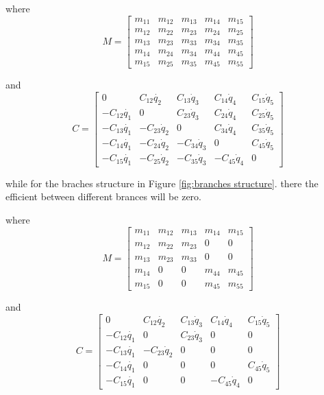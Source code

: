 where
\[
M=\left[\begin{array}{ccccc}
m_{11} & m_{12} & m_{13} & m_{14} & m_{15}\\
m_{12} & m_{22} & m_{23} & m_{24} & m_{25}\\
m_{13} & m_{23} & m_{33} & m_{34} & m_{35}\\
m_{14} & m_{24} & m_{34} & m_{44} & m_{45}\\
m_{15} & m_{25} & m_{35} & m_{45} & m_{55}\end{array}\right]
\]

and
\[
C=\left[\begin{array}{ccccc}
0 & C_{12}\dot{q_{2}} & C_{13}\dot{q}_{3} & C_{14}\dot{q}_{4} & C_{15}\dot{q}_{5}\\
-C_{12}\dot{q_{1}} & 0 & C_{23}\dot{q}_{3} & C_{24}\dot{q}_{4} & C_{25}\dot{q}_{5}\\
-C_{13}\dot{q_{1}} & -C_{23}\dot{q}_{2} & 0 & C_{34}\dot{q}_{4} & C_{35}\dot{q}_{5}\\
-C_{14}\dot{q_{1}} & -C_{24}\dot{q}_{2} & -C_{34}\dot{q}_{3} & 0 & C_{45}\dot{q}_{5}\\
-C_{15}\dot{q_{1}} & -C_{25}\dot{q}_{2} & -C_{35}\dot{q}_{3} & -C_{45}\dot{q}_{4} & 0\end{array}\right]
\]





while for the braches structure in Figure \ref{fig:branches structure}.
there the efficient between different brances will be zero.

where
\[
M=\left[\begin{array}{ccccc}
m_{11} & m_{12} & m_{13} & m_{14} & m_{15}\\
m_{12} & m_{22} & m_{23} & 0 & 0\\
m_{13} & m_{23} & m_{33} & 0 & 0\\
m_{14} & 0 & 0 & m_{44} & m_{45}\\
m_{15} & 0 & 0 & m_{45} & m_{55}\end{array}\right]
\]

and
\[
C=\left[\begin{array}{ccccc}
0 & C_{12}\dot{q_{2}} & C_{13}\dot{q}_{3} & C_{14}\dot{q}_{4} & C_{15}\dot{q}_{5}\\
-C_{12}\dot{q_{1}} & 0 & C_{23}\dot{q}_{3} & 0 & 0\\
-C_{13}\dot{q_{1}} & -C_{23}\dot{q}_{2} & 0 & 0 & 0\\
-C_{14}\dot{q_{1}} & 0 & 0 & 0 & C_{45}\dot{q}_{5}\\
-C_{15}\dot{q_{1}} & 0 & 0 & -C_{45}\dot{q}_{4} & 0\end{array}\right]
\]








